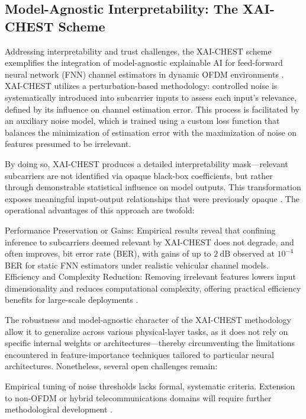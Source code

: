 \documentclass[sigconf]{acmart}
\begin{document}
\subsection{Model-Agnostic Interpretability: The XAI-CHEST Scheme}

Addressing interpretability and trust challenges, the XAI-CHEST scheme exemplifies the integration of model-agnostic explainable AI for feed-forward neural network (FNN) channel estimators in dynamic OFDM environments \cite{ref38,ref41}. XAI-CHEST utilizes a perturbation-based methodology: controlled noise is systematically introduced into subcarrier inputs to assess each input’s relevance, defined by its influence on channel estimation error. This process is facilitated by an auxiliary noise model, which is trained using a custom loss function that balances the minimization of estimation error with the maximization of noise on features presumed to be irrelevant. 

By doing so, XAI-CHEST produces a detailed interpretability mask—relevant subcarriers are not identified via opaque black-box coefficients, but rather through demonstrable statistical influence on model outputs. This transformation exposes meaningful input-output relationships that were previously opaque \cite{ref41}. The operational advantages of this approach are twofold:

Performance Preservation or Gains: Empirical results reveal that confining inference to subcarriers deemed relevant by XAI-CHEST does not degrade, and often improves, bit error rate (BER), with gains of up to \(2~\mathrm{dB}\) observed at \(10^{-4}\) BER for static FNN estimators under realistic vehicular channel models.
Efficiency and Complexity Reduction: Removing irrelevant features lowers input dimensionality and reduces computational complexity, offering practical efficiency benefits for large-scale deployments \cite{ref41}.

The robustness and model-agnostic character of the XAI-CHEST methodology allow it to generalize across various physical-layer tasks, as it does not rely on specific internal weights or architectures—thereby circumventing the limitations encountered in feature-importance techniques tailored to particular neural architectures. Nonetheless, several open challenges remain:

Empirical tuning of noise thresholds lacks formal, systematic criteria.
Extension to non-OFDM or hybrid telecommunications domains will require further methodological development \cite{ref38}.
\end{document}
